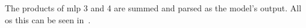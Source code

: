 The products of \gls{mlp} \num{3} and \num{4} are summed and parsed as the model's output. All os this can be seen in~.





